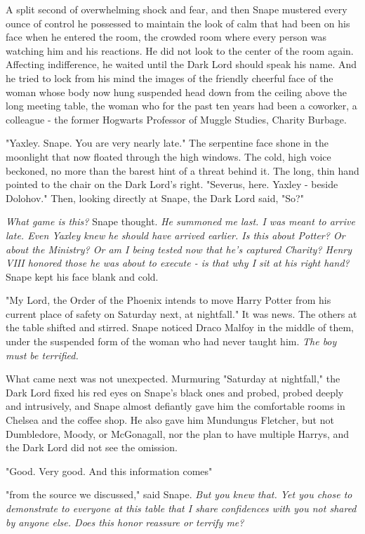 A split second of overwhelming shock and fear, and then Snape mustered every ounce of control he possessed to maintain the look of calm that had been on his face when he entered the room, the crowded room where every person was watching him and his reactions. He did not look to the center of the room again. Affecting indifference, he waited until the Dark Lord should speak his name. And he tried to lock from his mind the images of the friendly cheerful face of the woman whose body now hung suspended head down from the ceiling above the long meeting table, the woman who for the past ten years had been a coworker, a colleague - the former Hogwarts Professor of Muggle Studies, Charity Burbage.

"Yaxley. Snape. You are very nearly late." The serpentine face shone in the moonlight that now floated through the high windows. The cold, high voice beckoned, no more than the barest hint of a threat behind it. The long, thin hand pointed to the chair on the Dark Lord's right. "Severus, here. Yaxley - beside Dolohov." Then, looking directly at Snape, the Dark Lord said, "So?"

\emph{What game is this?} Snape thought. \emph{He summoned me last. I was meant to arrive late. Even Yaxley knew he should have arrived earlier. Is this about Potter? Or about the Ministry? Or am I being tested now that he's captured Charity? Henry VIII honored those he was about to execute - is that why I sit at his right hand?} Snape kept his face blank and cold.

"My Lord, the Order of the Phoenix intends to move Harry Potter from his current place of safety on Saturday next, at nightfall." It was news. The others at the table shifted and stirred. Snape noticed Draco Malfoy in the middle of them, under the suspended form of the woman who had never taught him. \emph{The boy must be terrified.}

What came next was not unexpected. Murmuring "Saturday{\el} at nightfall," the Dark Lord fixed his red eyes on Snape's black ones and probed, probed deeply and intrusively, and Snape almost defiantly gave him the comfortable rooms in Chelsea and the coffee shop. He also gave him Mundungus Fletcher, but not Dumbledore, Moody, or McGonagall, nor the plan to have multiple Harrys, and the Dark Lord did not see the omission.

"Good. Very good. And this information comes{\el}"

"{\el}from the source we discussed," said Snape. \emph{But you knew that. Yet you chose to demonstrate to everyone at this table that I share confidences with you not shared by anyone else. Does this honor reassure or terrify me?}

